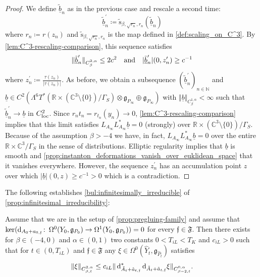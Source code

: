 \documentclass[11pt,a4paper]{scrartcl}
\newcommand*\diff{\mathop{}\!\textup{d}}
\newcommand{\col}{\colon \thinspace}
\newcommand{\VertWH}[3]{\Vert_{C^{{#1},\alpha}_{{#2}}{#3}}}
\newcommand{\VertWHt}[3]{\Vert_{C^{{#1},\alpha}_{{#2},t}{#3}}}
\numberwithin{equation}{section}
\theoremstyle{plain}
\theoremstyle{definition}
\theoremstyle{remark}
\begin{document}
\begin{proof}
We define $\tilde{\underline{b}}_n$ as in the previous case and rescale a second time: \[\tilde{\underline{b}}^\prime_n \coloneqq \tilde{\mathrm{s}}_{\beta,\sqrt{r_n},r_n}(\tilde{\underline{b}}_n) \] where $r_n \coloneqq r(z_n)$ and $\tilde{\mathrm{s}}_{\beta,\sqrt{r_n},r_n}$ is the map defined in \autoref{def:scaling_on_C^3}. By \autoref{lem:C^3-rescaling-comparison}, this sequence satisfies \[  \Vert \tilde{\underline{b}}^\prime_n \VertWH{2}{\beta}{} \leq 2c^2  \quad \textup{and} \quad \vert \tilde{\underline{b}}_n^\prime \vert (0, z^\prime_n)  \geq c^{-1}\] where $z^\prime_n \coloneqq \frac{\tau(z_n)}{\vert \tau(z_n) \vert}$. As before, we obtain a subsequence $(\tilde{\underline{b}}^\prime_n)_{n\in \mathbb{N}}$ and $\underline{b} \in C^{2}(\Lambda^6T^*(\mathbb{R}\times (\mathbb{C}^3\setminus \{0\})/\Gamma_S)\otimes \mathfrak{g}_{P_\infty}\oplus\mathfrak{g}_{P_\infty})$ with $\Vert \underline{b} \VertWH{1}{\beta}{}< \infty$ such that $\tilde{\underline{b}}^\prime_n \to \underline{b}$ in $C^2_\textup{loc}$. Since $r_nt_n = r_{t_n}(y_n) \to 0$, \autoref{lem:C^3-rescaling-comparison} implies that this limit satisfies $L_{A_\infty}L_{A_\infty}^* \underline{b} =0$ (strongly) over $\mathbb{R}\times (\mathbb{C}^3\setminus \{0\})/\Gamma_S$. Because of the assumption $\beta>-4$ we have, in fact, $L_{A_\infty}L_{A_\infty}^* \underline{b} =0$ over the entire $\mathbb{R}\times \mathbb{C}^3/\Gamma_S$ in the sense of distributions. Elliptic regularity implies that $\underline{b}$ is smooth and \autoref{prop:instanton_deformations_vanish_over_euklidean_space} that it vanishes everywhere. However, the sequence $z_n^\prime$ has an accumulation point $z$ over which $\vert \underline{b} \vert (0,z) \geq c^{-1} >0$ which is a contradiction.
\end{proof}

The following establishes \autoref{bul:infinitesimally_irreducible} of \autoref{prop:infinitesimal_irreducibility}:
\begin{proposition}\label{prop:linearEstimate-for-rigidity}
Assume that we are in the setup of \autoref{prop:pregluing-family} and assume that $\ker(\diff_{A_{0}+a_{0,\mathfrak{f}}}\col \Omega^0(Y_0,\mathfrak{g}_{P_0}) \to \Omega^1(Y_0,\mathfrak{g}_{P_0})) = 0$ for every $\mathfrak{f}\in \mathfrak{F}$. Then there exists for $\beta\in(-4,0)$ and $\alpha\in(0,1)$ two constants $0<T_{iL}<T_K$ and $c_{iL}>0$ such that for $t\in(0,T_{iL})$ and $\mathfrak{f} \in \mathfrak{F}$ any $\xi \in \Omega^0(\hat{Y}_t,\mathfrak{g}_{\hat{P}_t})$ satisfies \[\Vert \xi \VertWHt{2}{\beta}{} \leq c_{iL} \Vert \diff_{\tilde{A}_t+\tilde{a}_{t,\mathfrak{f}}}^*\diff_{\tilde{A}_t+\tilde{a}_{t,\mathfrak{f}}} \xi \VertWHt{0}{\beta-2}{}.\]
\end{proposition}
\end{document}
